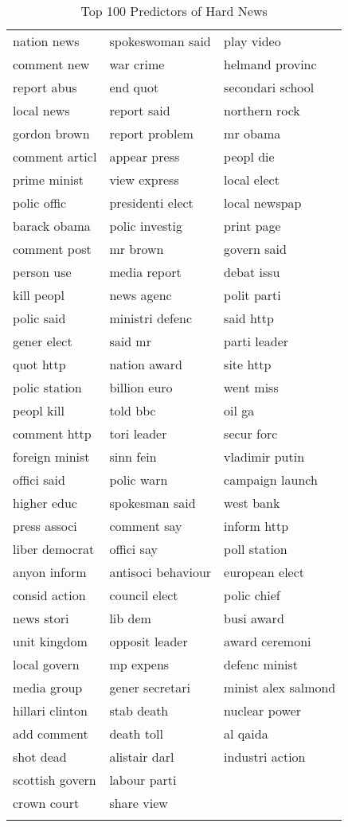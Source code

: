 \begingroup\small
\begin{longtable}{p{}p{}p{}}
\caption{Top 100 Predictors of Hard News} \\ 
  \hline
  \hline
nation news & spokeswoman said & play video \\ 
  comment new & war crime & helmand provinc \\ 
  report abus & end quot & secondari school \\ 
  local news & report said & northern rock \\ 
  gordon brown & report problem & mr obama \\ 
  comment articl & appear press & peopl die \\ 
  prime minist & view express & local elect \\ 
  polic offic & presidenti elect & local newspap \\ 
  barack obama & polic investig & print page \\ 
  comment post & mr brown & govern said \\ 
  person use & media report & debat issu \\ 
  kill peopl & news agenc & polit parti \\ 
  polic said & ministri defenc & said http \\ 
  gener elect & said mr & parti leader \\ 
  quot http & nation award & site http \\ 
  polic station & billion euro & went miss \\ 
  peopl kill & told bbc & oil ga \\ 
  comment http & tori leader & secur forc \\ 
  foreign minist & sinn fein & vladimir putin \\ 
  offici said & polic warn & campaign launch \\ 
  higher educ & spokesman said & west bank \\ 
  press associ & comment say & inform http \\ 
  liber democrat & offici say & poll station \\ 
  anyon inform & antisoci behaviour & european elect \\ 
  consid action & council elect & polic chief \\ 
  news stori & lib dem & busi award \\ 
  unit kingdom & opposit leader & award ceremoni \\ 
  local govern & mp expens & defenc minist \\ 
  media group & gener secretari & minist alex salmond \\ 
  hillari clinton & stab death & nuclear power \\ 
  add comment & death toll & al qaida \\ 
  shot dead & alistair darl & industri action \\ 
  scottish govern & labour parti &  \\ 
  crown court & share view &  \\ 
   \hline
\hline
\label{tab:top_100_hard}
\end{longtable}
\endgroup
